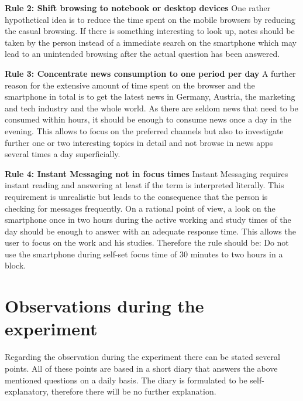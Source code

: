 \documentclass[11pt,letterpaper]{article}
\begin{document}
\textbf{Rule 2: Shift browsing to notebook or desktop devices}
One rather hypothetical idea is to reduce the time spent on the mobile browsers by reducing the casual browsing. If there is something interesting to look up, notes should be taken by the person instead of a immediate search on the smartphone which may lead to an unintended browsing after the actual question has been answered. \newline

\textbf{Rule 3: Concentrate news consumption to one period per day}
A further reason for the extensive amount of time spent on the browser and the smartphone in total is to get the latest news in Germany, Austria, the marketing and tech industry and the whole world. As there are seldom news that need to be consumed within hours, it should be enough to consume news once a day in the evening. This allows to focus on the preferred channels but also to investigate further one or two interesting topics in detail and not browse in news apps several times a day superficially. \newline

\textbf{Rule 4: Instant Messaging not in focus times}
Instant Messaging requires instant reading and answering at least if the term is interpreted literally. This requirement is unrealistic but leads to the consequence that the person is checking for messages frequently. On a rational point of view, a look on the smartphone once in two hours during the active working and study times of the day should be enough to answer with an adequate response time. This allows the user to focus on the work and his studies. Therefore the rule should be: Do not use the smartphone during self-set focus time of 30 minutes to two hours in a block. \newline

\section*{Observations during the experiment}
Regarding the observation during the experiment there can be stated several points. All of these points are based in a short diary that answers the above mentioned questions on a daily basis. The diary is formulated to be self-explanatory, therefore there will be no further explanation.
\end{document}
